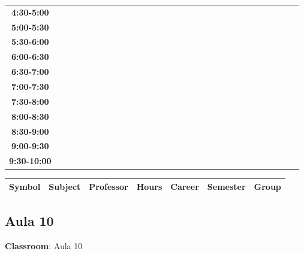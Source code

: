 \documentclass{article}
\begin{document}
\begin{table}[ht]
\begin{tabular}{|c|c|c|c|c|c|c|c|c|c|c|c|c|c|c|c|c|c|c|c|c|c|c|c|c|c|c|c|c|c|}
 \cline{1-8} 
\textbf{4:30-5:00} &   &   &   &   &   &   &   \\
 \cline{1-8} 
\textbf{5:00-5:30} &   &   &   &   &   &   &   \\
 \cline{1-8} 
\textbf{5:30-6:00} &   &   &   &   &   &   &   \\
 \cline{1-8} 
\textbf{6:00-6:30} &   &   &   &   &   &   &   \\
 \cline{1-8} 
\textbf{6:30-7:00} &   &   &   &   &   &   &   \\
 \cline{1-8} 
\textbf{7:00-7:30} &   &   &   &   &   &   &   \\
 \cline{1-8} 
\textbf{7:30-8:00} &   &   &   &   &   &   &   \\
 \cline{1-8} 
\textbf{8:00-8:30} &   &   &   &   &   &   &   \\
 \cline{1-8} 
\textbf{8:30-9:00} &   &   &   &   &   &   &   \\
 \cline{1-8} 
\textbf{9:00-9:30} &   &   &   &   &   &   &   \\
 \cline{1-8} 
\textbf{9:30-10:00} &   &   &   &   &   &   &   \\
 \cline{1-8} 
\end{tabular}\end{table}

        
        \begin{tabular}{|>{\centering\arraybackslash}m{2cm}|>{\centering\arraybackslash}m{4cm}|>{\centering\arraybackslash}m{2.15cm}|>{\centering\arraybackslash}m{1.8cm}|>{\centering\arraybackslash}m{2cm}|>{\centering\arraybackslash}m{2cm}|>{\centering\arraybackslash}m{2cm}|}
        \hline
        \textbf{Symbol} & \textbf{Subject} & \textbf{Professor} & \textbf{Hours} & \textbf{Career} & \textbf{Semester} & \textbf{Group} \\
        \hline
        \end{tabular}
                    

        \newpage
        

        \subsection{Aula 10}
        \vspace*{.1cm}
        
        \begin{flushright}
            {\LARGE \textbf{Classroom}: Aula 10}
        \end{flushright}
        \vspace{1cm}
\end{document}
